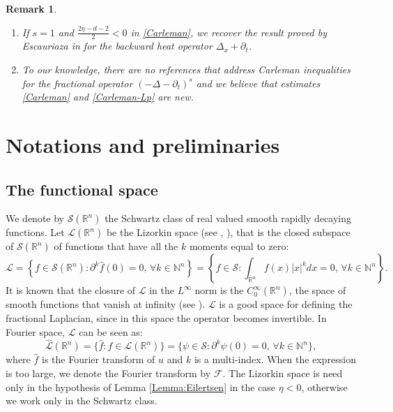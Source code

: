 \documentclass[11pt, twoside, notitlepage]{amsart}
\newtheorem{remark}{Remark}
\numberwithin{equation}{section}
\begin{document}
\begin{remark} \begin{enumerate}
              \item[(i)] If $s=1$ and $\frac{  2\eta-d -2 }{2} <0$ in \eqref{Carleman}, we recover the result  proved by Escauriaza in \cite[Thm.1]{EscauriazaDuke2000} for the backward heat operator $\Delta_x+\partial_t$.
\item[(ii)] To our knowledge, there are no references that address Carleman inequalities for the fractional operator $(-\Delta-\partial_t)^s$ and we believe that estimates \eqref{Carleman}  and \eqref{Carleman-Lp} are new.
                   \end{enumerate}
\end{remark}

\section{Notations and preliminaries}



 \subsection{The functional space} We denote by $\mathcal{S}(\mathbb{R}^n)$  the Schwartz class of real valued smooth rapidly decaying functions.  Let $\mathcal{L}(\mathbb{R}^n)$ be the Lizorkin space (see \cite{EilertsenJFA2001}, \cite[Section 4]{Troyanov}), that is the closed subspace of $\mathcal{S}(\mathbb{R}^n)$ of functions that have all the $k$ moments equal to zero:
$$\mathcal{L}=\left\{ f \in \mathcal{S}(\mathbb{R}^n):   \partial^{k} \widehat{f}(0)=0, \, \forall k \in \mathbb{N}^n  \right\} = \left\{ f \in \mathcal{S}:  \int_{\mathbb{R}^n } f(x) |x|^k dx= 0, \, \forall k \in \mathbb{N}^n  \right\}. $$
It is known that the closure of $\mathcal{L}$ in the $L ^\infty$ norm is the $C_0^{\infty}(\mathbb{R}^n)$, the space of smooth functions that vanish at infinity (see \cite[Thm.3.2]{Neumayer-Unser}).
$\mathcal{L}$ is a good space for defining the fractional Laplacian, since in this space the operator becomes invertible.
 In Fourier space, $\mathcal{L}$ can be seen as:
 $$\widehat{\mathcal{L}} (\mathbb{R}^n)= \{ \hat{f}: f\in \mathcal{L}(\mathbb{R}^n) \} = \{  \psi \in \mathcal{S}: \partial^{k} \psi(0)=0, \, \forall k \in \mathbb{N}^n\},$$
 where $\widehat{f}$ is the Fourier transform of $u$ and $k$ is a multi-index.   When the expression is too large, we denote the Fourier transform by $\mathcal{F}$.  The Lizorkin space is need only in the hypothesis of Lemma \ref{Lemma:Eilertsen} in the case $\eta<0$, otherwise we work only in the Schwartz class.
\end{document}
